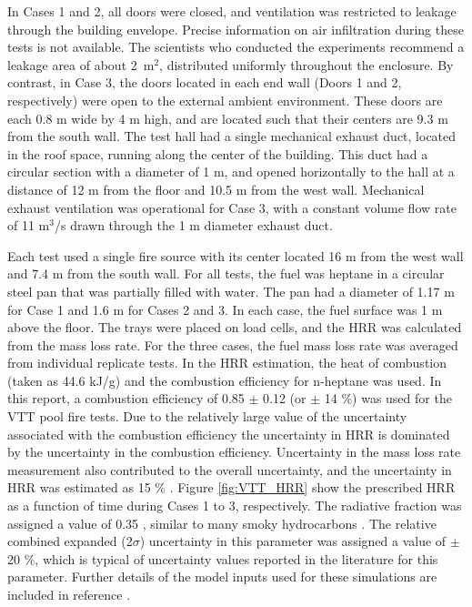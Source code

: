 In Cases 1 and 2, all doors were closed, and ventilation was restricted to leakage through the building envelope. Precise information on air infiltration during these tests is not available. The scientists who conducted the experiments recommend a leakage area of about 2~m$^2$, distributed uniformly throughout the enclosure. By contrast, in Case 3, the doors located in each end wall (Doors 1 and 2, respectively) were open to the external ambient environment. These doors are each 0.8 m wide by 4 m high, and are located such that their centers are 9.3 m from the south wall. The test hall had a single mechanical exhaust duct, located in the roof space, running along the center of the building. This duct had a circular section with a diameter of 1 m, and opened horizontally to the hall at a distance of 12 m from the floor and 10.5 m from the west wall. Mechanical exhaust ventilation was operational for Case 3, with a constant volume flow rate of 11 m$^3$/s drawn through the 1 m diameter exhaust duct.

Each test used a single fire source with its center located 16 m from the west wall and 7.4 m from the south wall. For all tests, the fuel was heptane in a circular steel pan that was partially filled with water. The pan had a diameter of 1.17 m for Case 1 and 1.6 m for Cases 2 and 3. In each case, the fuel surface was 1 m above the floor. The trays were placed on load cells, and the HRR was calculated from the mass loss rate. For the three cases, the fuel mass loss rate was averaged from individual replicate tests. In the HRR estimation, the heat of combustion (taken as 44.6 kJ/g) and the combustion efficiency for n-heptane was used.  In this report, a combustion efficiency of 0.85 $\pm$ 0.12 (or $\pm$ 14 \%) was used for the VTT pool fire tests. Due to the relatively large value of the uncertainty associated with the combustion efficiency the uncertainty in HRR is dominated by the uncertainty in the combustion efficiency. Uncertainty in the mass loss rate measurement also contributed to the overall uncertainty, and the uncertainty in HRR was estimated as 15 \% \cite{NRCNUREG1824}. Figure \ref{fig:VTT_HRR} show the prescribed HRR as a function of time during Cases 1 to 3, respectively. The radiative fraction was assigned a value of 0.35 \cite{NRCNUREG1824}, similar to many smoky hydrocarbons \cite{Hamins:1991}. The relative combined expanded (2$\sigma$) uncertainty in this parameter was assigned a value of $\pm$ 20 \%, which is typical of uncertainty values reported in the literature for this parameter. Further details of the model inputs used for these simulations are included in reference \cite{NRCNUREG1824}.

